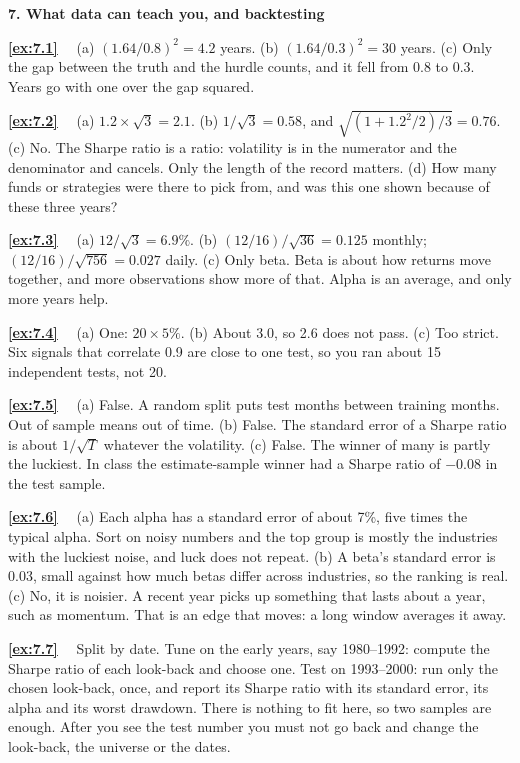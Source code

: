 \documentclass[11pt]{article}
\newcounter{ex}[section]
\newcommand{\sol}[1]{\par\smallskip\textbf{\ref{#1}}\ \ }
\newcommand{\head}[1]{\par\medskip\textbf{#1}\par}
\begin{document}
{\head{7. What data can teach you, and backtesting}

\sol{ex:7.1} (a) $(1.64/0.8)^{2} = 4.2$ years. (b) $(1.64/0.3)^{2} = 30$ years. (c) Only the gap between the truth and the
hurdle counts, and it fell from 0.8 to 0.3. Years go with one over the gap squared.

\sol{ex:7.2} (a) $1.2\times\sqrt{3} = 2.1$. (b) $1/\sqrt{3} = 0.58$, and $\sqrt{(1 + 1.2^{2}/2)/3} = 0.76$. (c) No. The Sharpe
ratio is a ratio: volatility is in the numerator and the denominator and cancels. Only the length of the record
matters. (d) How many funds or strategies were there to pick from, and was this one shown because of these three
years?

\sol{ex:7.3} (a) $12/\sqrt{3} = 6.9\%$. (b) $(12/16)/\sqrt{36} = 0.125$ monthly; $(12/16)/\sqrt{756} = 0.027$ daily. (c) Only
beta. Beta is about how returns move together, and more observations show more of that. Alpha is an average, and only
more years help.

\sol{ex:7.4} (a) One: $20\times 5\%$. (b) About 3.0, so 2.6 does not pass. (c) Too strict. Six signals that correlate 0.9
are close to one test, so you ran about 15 independent tests, not 20.

\sol{ex:7.5} (a) False. A random split puts test months between training months. Out of sample means out of time.
(b) False. The standard error of a Sharpe ratio is about $1/\sqrt{T}$ whatever the volatility. (c) False. The winner of
many is partly the luckiest. In class the estimate-sample winner had a Sharpe ratio of $-0.08$ in the test sample.

\sol{ex:7.6} (a) Each alpha has a standard error of about 7\%, five times the typical alpha. Sort on noisy numbers and
the top group is mostly the industries with the luckiest noise, and luck does not repeat. (b) A beta's standard error
is 0.03, small against how much betas differ across industries, so the ranking is real. (c) No, it is noisier. A recent
year picks up something that lasts about a year, such as momentum. That is an edge that moves: a long window averages
it away.

\sol{ex:7.7} Split by date. Tune on the early years, say 1980--1992: compute the Sharpe ratio of each look-back and
choose one. Test on 1993--2000: run only the chosen look-back, once, and report its Sharpe ratio with its standard
error, its alpha and its worst drawdown. There is nothing to fit here, so two samples are enough. After you see the
test number you must not go back and change the look-back, the universe or the dates.

}
\end{document}
